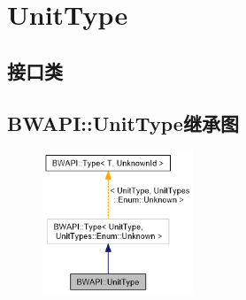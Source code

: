 \tableofcontents
\section{UnitType}
\subsection{接口类}
\subsection{BWAPI::UnitType继承图}
\begin{figure}[H]
    \centering
    \includegraphics[width=0.4\textwidth]{figures/UnitType继承图.png}
\end{figure}
